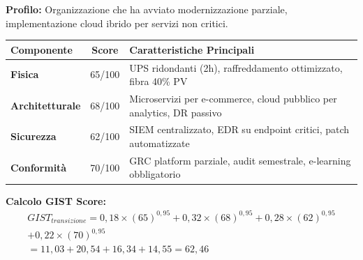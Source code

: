 \begin{tcolorbox}[
    colback=orange!5!white,
    colframe=orange!75!black,
    title={\textbf{Scenario 2:} GDO in Transizione Digitale},
    fonttitle=\bfseries,
    boxrule=1.5pt,
    arc=2mm,
    breakable,
    width=\textwidth
]

\textbf{Profilo:} Organizzazione che ha avviato modernizzazione parziale, implementazione cloud ibrido per servizi non critici.

\begin{center}
\begin{tabularx}{\textwidth}{l c X}
\toprule
\textbf{Componente} & \textbf{Score} & \textbf{Caratteristiche Principali} \\
\midrule
\textbf{Fisica} & 65/100 & UPS ridondanti (2h), raffreddamento ottimizzato, fibra 40\% PV \\
\textbf{Architetturale} & 68/100 & Microservizi per e-commerce, cloud pubblico per analytics, DR passivo \\
\textbf{Sicurezza} & 62/100 & SIEM centralizzato, EDR su endpoint critici, patch automatizzate \\
\textbf{Conformità} & 70/100 & GRC platform parziale, audit semestrale, e-learning obbligatorio \\
\bottomrule
\end{tabularx}
\end{center}

\textbf{Calcolo GIST Score:}
\begin{multline}
GIST_{transizione} = 0,18 \times (65)^{0,95} + 0,32 \times (68)^{0,95} + 0,28 \times (62)^{0,95} \\ + 0,22 \times (70)^{0,95} \\
= 11,03 + 20,54 + 16,34 + 14,55 = \boxed{62,46}
\end{multline}

\end{tcolorbox}

